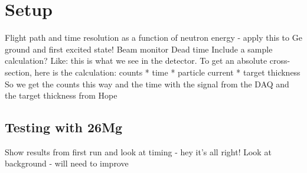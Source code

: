 \section{Setup}
Flight path and time resolution as a function of neutron energy - apply this to Ge ground and first excited state!
Beam monitor
Dead time
Include a sample calculation?  Like: this is what we see in the detector.  To get an absolute cross-section, here is the calculation:
counts * time * particle current * target thickness
So we get the counts this way and the time with the signal from the DAQ and the target thickness from Hope



\subsection{Testing with 26Mg}
Show results from first run and look at timing - hey it's all right!
Look at background - will need to improve

%
% 
% 
